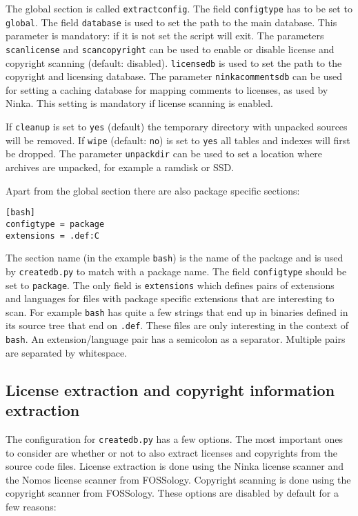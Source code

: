 \documentclass[10pt]{article}
\begin{document}
The global section is called \texttt{extractconfig}. The field
\texttt{configtype} has to be set to \texttt{global}. The field
\texttt{database} is used to set the path to the main database. This parameter
is mandatory: if it is not set the script will exit. The parameters
\texttt{scanlicense} and \texttt{scancopyright} can be used to enable or
disable license and copyright scanning (default: disabled). \texttt{licensedb}
is used to set the path to the copyright and licensing database. The parameter
\texttt{ninkacommentsdb} can be used for setting a caching database for mapping
comments to licenses, as used by Ninka. This setting is mandatory if license
scanning is enabled.

If \texttt{cleanup} is set to \texttt{yes} (default) the temporary directory
with unpacked sources will be removed. If \texttt{wipe} (default: \texttt{no})
is set to \texttt{yes} all tables and indexes will first be dropped. The
parameter \texttt{unpackdir} can be used to set a location where archives are
unpacked, for example a ramdisk or SSD.

Apart from the global section there are also package specific sections:

\begin{verbatim}
[bash]
configtype = package
extensions = .def:C
\end{verbatim}

The section name (in the example \texttt{bash}) is the name of the package and
is used by \texttt{createdb.py} to match with a package name. The field
\texttt{configtype} should be set to \texttt{package}. The only field is
\texttt{extensions} which defines pairs of extensions and languages for files
with package specific extensions that are interesting to scan. For example
\texttt{bash} has quite a few strings that end up in binaries defined in its
source tree that end on \texttt{.def}. These files are only interesting in the
context of \texttt{bash}. An extension/language pair has a semicolon as a
separator. Multiple pairs are separated by whitespace.

\subsection{License extraction and copyright information extraction}

The configuration for \texttt{createdb.py} has a few options. The most important
ones to consider are whether or not to also extract licenses and copyrights from
the source code files.  License extraction is done using the Ninka license
scanner and the Nomos license scanner from FOSSology. Copyright scanning is done
using the copyright scanner from FOSSology. These options are disabled
by default for a few reasons:
\end{document}
